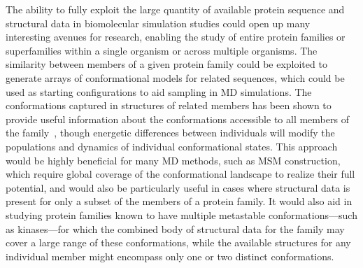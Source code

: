 \documentclass[aps,pre,twocolumn,nofootinbib,superscriptaddress,linenumbers]{revtex4-1}
\begin{document}
The ability to fully exploit the large quantity of available protein sequence and structural data in biomolecular simulation studies could open up many interesting avenues for research, enabling the study of entire protein families or superfamilies within a single organism or across multiple organisms.
The similarity between members of a given protein family could be exploited to generate arrays of conformational models for related sequences, which could be used as starting configurations to aid sampling in MD simulations.
The conformations captured in structures of related members has been shown to provide useful information about the conformations accessible to all members of the family~\cite{friedland:plos-comput-biol:2009:conformational-dynamics,sali:2012:allostery-modeling}, though energetic differences between individuals will modify the populations and dynamics of individual conformational states.
This approach would be highly beneficial for many MD methods, such as MSM construction, which require global coverage of the conformational landscape to realize their full potential, and would also be particularly useful in cases where structural data is present for only a subset of the members of a protein family.
It would also aid in studying protein families known to have multiple metastable conformations---such as kinases---for which the combined body of structural data for the family may cover a large range of these conformations, while the available structures for any individual member might encompass only one or two distinct conformations.
\color{black}
\end{document}
